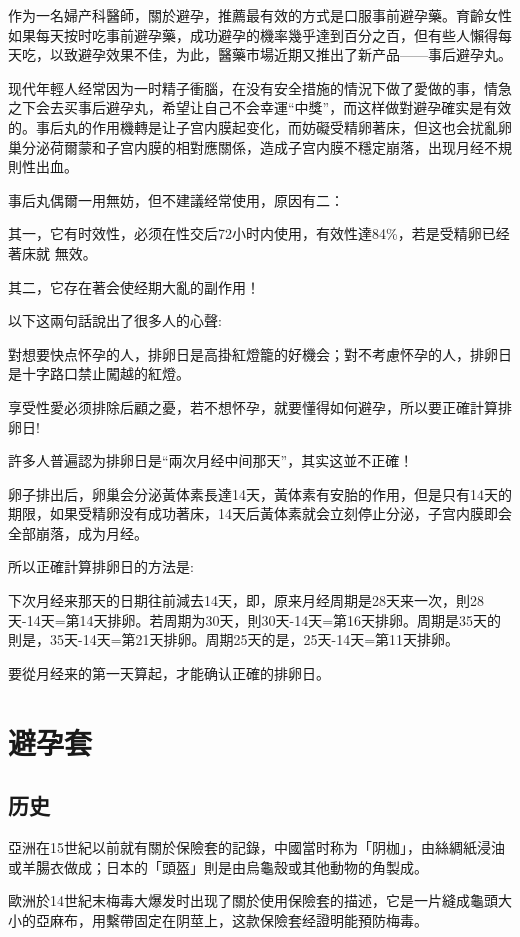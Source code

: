 \documentclass[12pt,UTF8]{ctexbook}
\begin{document}
作为一名婦产科醫師，關於避孕，推薦最有效的方式是口服事前避孕藥。育齡女性如果每天按时吃事前避孕藥，成功避孕的機率幾乎達到百分之百，但有些人懶得每天吃，以致避孕效果不佳，为此，醫藥市場近期又推出了新产品——事后避孕丸。

现代年輕人经常因为一时精子衝腦，在没有安全措施的情況下做了愛做的事，情急之下会去买事后避孕丸，希望让自己不会幸運“中獎”，而这样做對避孕確实是有效的。事后丸的作用機轉是让子宫内膜起变化，而妨礙受精卵著床，但这也会扰亂卵巢分泌荷爾蒙和子宫内膜的相對應關係，造成子宫内膜不穩定崩落，出现月经不規則性出血。

事后丸偶爾一用無妨，但不建議经常使用，原因有二：

其一，它有时效性，必须在性交后72小时内使用，有效性達84\%，若是受精卵已经著床就
無效。

其二，它存在著会使经期大亂的副作用！

以下这兩句話說出了很多人的心聲:

對想要快点怀孕的人，排卵日是高掛紅燈籠的好機会；對不考慮怀孕的人，排卵日是十字路口禁止闖越的紅燈。

享受性愛必须排除后顧之憂，若不想怀孕，就要懂得如何避孕，所以要正確計算排卵日!

許多人普遍認为排卵日是“兩次月经中间那天”，其实这並不正確！

卵子排出后，卵巢会分泌黃体素長達14天，黃体素有安胎的作用，但是只有14天的期限，如果受精卵没有成功著床，14天后黃体素就会立刻停止分泌，子宫内膜即会全部崩落，成为月经。

所以正確計算排卵日的方法是:

下次月经来那天的日期往前減去14天，即，原来月经周期是28天来一次，則28天-14天=第14天排卵。若周期为30天，則30天-14天=第16天排卵。周期是35天的則是，35天-14天=第21天排卵。周期25天的是，25天-14天=第11天排卵。

要從月经来的第一天算起，才能确认正確的排卵日。

\section{避孕套}

\subsection{历史}

亞洲在15世紀以前就有關於保險套的記錄，中國當时称为「阴枷」，由絲綢紙浸油或羊腸衣做成；日本的「頭盔」則是由烏龜殼或其他動物的角製成。

歐洲於14世紀末梅毒大爆发时出现了關於使用保險套的描述，它是一片縫成龜頭大小的亞麻布，用繫帶固定在阴莖上，这款保險套经證明能預防梅毒。
\end{document}
